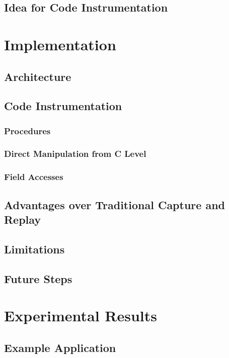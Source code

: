 \documentclass[a4paper,10pt]{article}
\begin{document}
\subsection{Idea for Code Instrumentation}



\section{Implementation}
\subsection{Architecture}
\subsection{Code Instrumentation}
\subsubsection{Procedures}
\subsubsection{Direct Manipulation from C Level}
\subsubsection{Field Accesses}
\subsection{Advantages over Traditional Capture and Replay}
\subsection{Limitations}
\subsection{Future Steps}

\section{Experimental Results}
\subsection{Example Application}
\end{document}
